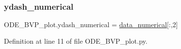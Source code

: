 \mbox{\label{namespaceODE__BVP__plot_a321cad715aaa19b55082e3163d7cf2ee}} 
\subsubsection{\texorpdfstring{ydash\+\_\+numerical}{ydash\_numerical}}
{\footnotesize\ttfamily O\+D\+E\+\_\+\+B\+V\+P\+\_\+plot.\+ydash\+\_\+numerical = \hyperlink{namespaceODE__BVP__plot_ad4ab2d9ae63df8f94362a1abefb1b540}{data\+\_\+numerical}\mbox{[}\+:,2\mbox{]}}



Definition at line 11 of file O\+D\+E\+\_\+\+B\+V\+P\+\_\+plot.\+py.

